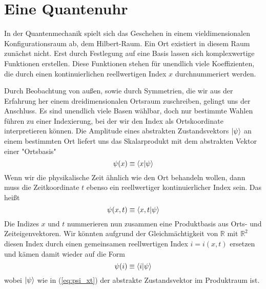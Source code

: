 \documentclass[12pt]{article}
\begin{document}
\section{Eine Quantenuhr}

In der Quantenmechanik spielt sich das Geschehen in einem vieldimensionalen Konfigurationsraum ab, dem Hilbert-Raum. Ein Ort existiert in diesem Raum zunächst nicht. Erst durch Festlegung auf eine Basis lassen sich komplexwertige Funktionen erstellen. Diese Funktionen stehen für unendlich viele Koeffizienten, die durch einen kontinuierlichen reellwertigen Index $x$ durchnummeriert werden.

Durch Beobachtung von außen, sowie durch Symmetrien, die wir aus der Erfahrung her einem dreidimensionalen Ortsraum zuschreiben, gelingt uns der Anschluss. Es sind unendlich viele Basen wählbar, doch nur bestimmte Wahlen führen zu einer Indexierung, bei der wir den Index als Ortskoordinate interpretieren können. Die Amplitude eines abstrakten Zustandsvektors $\ket{\psi}$ an einem bestimmten Ort liefert uns das Skalarprodukt mit dem abstrakten Vektor einer "Ortsbasis"
\begin{equation} 
\psi(x) \equiv \bra{x}\ket{\psi} 
\end{equation}
Wenn wir die physikalische Zeit ähnlich wie den Ort behandeln wollen, dann muss die Zeitkoordinate $t$ ebenso ein reellwertiger kontinuierlicher Index sein. Das heißt
\begin{equation} 
\label{eq:psi_xt}
\psi(x,t) \equiv \bra{x,t}\ket{\psi} 
\end{equation}
Die Indizes $x$ und $t$ nummerieren nun zusammen eine Produktbasis aus Orts- und Zeiteigenvektoren. Wir könnten aufgrund der Gleichmächtigkeit von $\mathbb{R}$ mit $\mathbb{R}^2$ diesen Index durch einen gemeinsamen reellwertigen Index $i = i(x,t)$ ersetzen und kämen damit wieder auf die Form
\begin{equation}
\psi(i) \equiv \bra{i}\ket{\psi} 
\end{equation}
wobei $\ket{\psi}$ wie in (\ref{eq:psi_xt}) der abstrakte Zustandsvektor im Produktraum ist.
\end{document}
